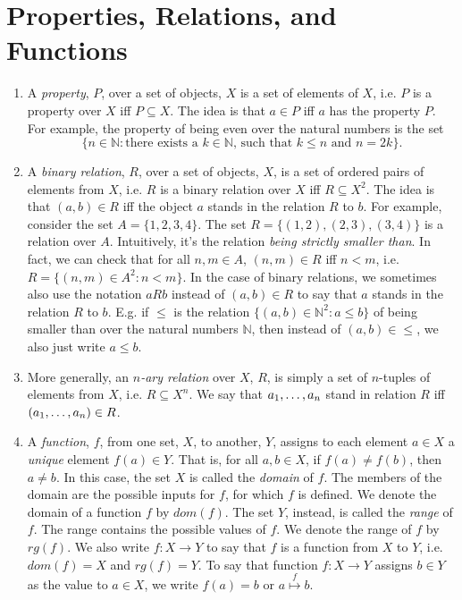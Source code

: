 \section{Properties, Relations, and Functions}

\begin{enumerate}[\thesection.1]

	\item A \emph{property}, $P$, over a set of objects, $X$ is a set of elements of $X$, i.e. $P$ is a property over $X$ iff $P\subseteq X$. The idea is that $a\in P$ iff $a$ has the property $P$. For example, the property of being even over the natural numbers is the set \[\{n\in\mathbb{N}:\text{there exists a }k\in\mathbb{N}\text{, such that }k\leq n\text{ and }n=2k\}.\]


	\item A \emph{binary relation}, $R$, over a set of objects, $X$, is a set of ordered pairs of elements from $X$, i.e. $R$ is a binary relation over $X$ iff $R\subseteq X^2$. The idea is that $(a,b)\in R$ iff the object $a$ stands in the relation $R$ to $b$. For example, consider the set $A=\{1,2,3,4\}$. The set $R=\{(1,2), (2,3), (3,4)\}$ is a relation over $A$. Intuitively, it's the relation \emph{being strictly smaller than}. In fact, we can check that for all $n,m\in A$, $(n,m)\in R$ iff $n<m$, i.e. $R=\{(n,m)\in A^2: n<m\}$. In the case of binary relations, we sometimes also use the notation $aRb$ instead of $(a,b)\in R$ to say that $a$ stands in the relation $R$ to $b$. E.g. if $\leq$ is the relation $\{(a,b)\in \mathbb{N}^2: a\leq b\}$ of being smaller than over the natural numbers $\mathbb{N}$, then instead of $(a,b)\in {\leq}$, we also just write $a\leq b$.

\item More generally, an \emph{$n$-ary relation} over $X$, $R$, is simply a set of $n$-tuples of elements from $X$, i.e. $R\subseteq X^n$. We say that $a_1, \mathellipsis, a_n$ stand in relation $R$ iff $(a_1, \mathellipsis, a_n)\in R$. 


\item A \emph{function}, $f$, from one set, $X$, to another, $Y$, assigns to each element $a\in X$ a \emph{unique} element $f(a)\in Y$. That is, for all $a,b\in X$, if $f(a)\neq f(b)$, then $a\neq b$. In this case, the set $X$ is called the \emph{domain} of $f$. The members of the domain are the possible inputs for $f$, for which $f$ is defined. We denote the domain of a function $f$ by $dom(f)$. The set $Y$, instead, is called the \emph{range} of $f$. The range contains the possible values of $f$. We denote the range of $f$ by $rg(f)$. We also write $f:X\to Y$ to say that $f$ is a function from $X$ to $Y$, i.e. $dom(f)=X$ and $rg(f)=Y$. To say that function $f:X\to Y$ assigns $b\in Y$ as the value to $a\in X$, we write $f(a)=b$ or $a\overset{f}{\mapsto}b$.


\end{enumerate}
